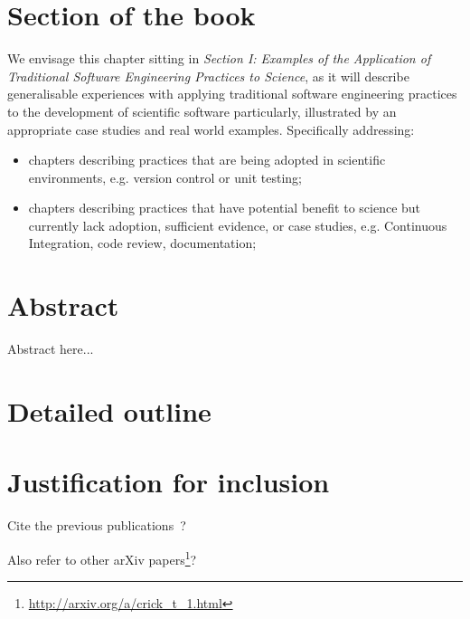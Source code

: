 \documentclass[a4paper,11pt]{article}
\begin{document}
\section*{Section of the book}

We envisage this chapter sitting in {\emph{Section I: Examples of the
Application of Traditional Software Engineering Practices to
Science}}, as it will describe generalisable experiences with applying
traditional software engineering practices to the development of
scientific software particularly, illustrated by an appropriate case
studies and real world examples. Specifically addressing:

\begin{itemize}
\item chapters describing practices that are being adopted in
  scientific environments, e.g. version control or unit testing;
\item chapters describing practices that have potential benefit to
  science but currently lack adoption, sufficient evidence, or case
  studies, e.g. Continuous Integration, code review, documentation;
\end{itemize}

\section*{Abstract}

Abstract here...

\section*{Detailed outline}

\section*{Justification for inclusion}

Cite the previous
publications~\cite{crick-et-al_wssspe2,crick-et-al_recomp2014,crick-et-al_jors,crick-et-al_cse2015}?

Also refer to other arXiv papers\footnote{\url{http://arxiv.org/a/crick_t_1.html}}?




\end{document}
